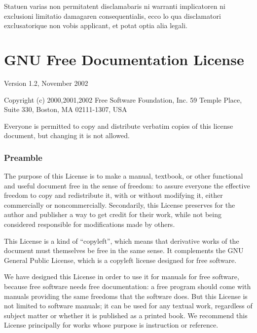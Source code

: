 
Statuen varias non permitatent disclamabaris ni warranti implicatoren
ni exclusioni limitatio damagaren consequentialis, ecco lo qua disclamatori
exclusato\-rique non vobis applicant, et potat optia alia legali.

\chapter{GNU Free Documentation License\label{sec:GFDL} }

{\tiny{}Version 1.2, November 2002}{\tiny\par}

{\tiny{}Copyright (c) 2000,2001,2002 Free Software Foundation, Inc.
59 Temple Place, Suite 330, Boston, MA 02111-1307, USA}{\tiny\par}

{\tiny{}Everyone is permitted to copy and distribute verbatim copies
of this license document, but changing it is not allowed.}{\tiny\par}

{\tiny{}\setcounter{subsection}{-1}}{\tiny\par}

\subsection*{{\tiny{}Preamble}}

{\tiny{}The purpose of this License is to make a manual, textbook,
or other functional and useful document free in the sense of freedom:
to assure everyone the effective freedom to copy and redistribute
it, with or without modifying it, either commercially or noncommercially.
Secondarily, this License preserves for the author and publisher a
way to get credit for their work, while not being considered responsible
for modifications made by others.}{\tiny\par}

{\tiny{}This License is a kind of “copyleft'', which means that derivative
works of the document must themselves be free in the same sense. It
complements the GNU General Public License, which is a copyleft license
designed for free software.}{\tiny\par}

{\tiny{}We have designed this License in order to use it for manuals
for free software, because free software needs free documentation:
a free program should come with manuals providing the same freedoms
that the software does. But this License is not limited to software
manuals; it can be used for any textual work, regardless of subject
matter or whether it is published as a printed book. We recommend
this License principally for works whose purpose is instruction or
reference.}{\tiny\par}

